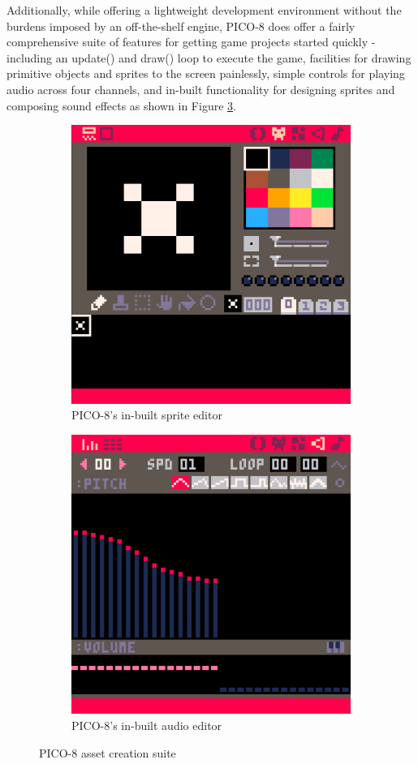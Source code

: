 \documentclass[11pt]{article}
\begin{document}
Additionally, while offering a lightweight development environment without the burdens
imposed by an off-the-shelf engine, PICO-8 does offer a fairly comprehensive suite of
features for getting game projects started quickly - including an \textunderscore update()
and \textunderscore draw()
loop to execute the game, facilities for drawing primitive objects and sprites
to the screen painlessly, simple controls for playing audio across four channels, and
in-built functionality for designing sprites and composing sound effects as shown in Figure
\ref{fig:pico}.

\begin{figure}[h]
\begin{subfigure}{.5\textwidth}
  \centering
  \includegraphics[width=.8\linewidth]{sprite_editor}
  \caption{PICO-8's in-built sprite editor}
  \label{fig:pfig1}
\end{subfigure}
\begin{subfigure}{.5\textwidth}
  \centering
  \includegraphics[width=.8\linewidth]{audio_editor}
  \caption{PICO-8's in-built audio editor}
  \label{fig:pfig2}
\end{subfigure}
\caption{PICO-8 asset creation suite}
\label{fig:pico}
\end{figure}
\end{document}
